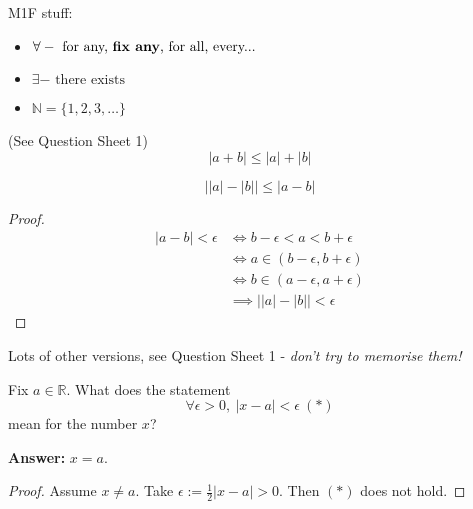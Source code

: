 

\pagebreak
\setcounter{section}{-1}

\setcounter{lecture}{0}

\setcounter{page}{4}


M1F stuff:

\begin{itemize}
\item $\forall - \text{ for any, \textbf{fix any}, for all, every...}$
\item $\exists - \text{ there exists}$
\item $\mathbb{N} = \{1,2,3,\dots\}$ 
\end{itemize}

\begin{theorem}
(See Question Sheet 1)
	\[|a+b| \leq |a| + |b|\]
\end{theorem}

\begin{corollary}
\[\left||a| - |b|\right|\leq |a-b|	\]
\end{corollary}
\begin{proof}
\[
\begin{aligned}
|a-b| < \epsilon &\iff b-\epsilon < a < b + \epsilon\\
&\iff a \in (b-\epsilon, b+\epsilon)\\
&\iff b \in (a-\epsilon, a+\epsilon)	\\
&\implies \left||a| - |b|\right|< \epsilon
\end{aligned} \] 
\end{proof}

Lots of other versions, see Question Sheet 1 - \emph{don't try to memorise them!}\\



\begin{clicker}
Fix $a \in \mathbb{R}$. What does the statement 
\[\forall \epsilon >0,~|x-a|<\epsilon ~(*)\]
mean for the number $x$? 

\textbf{Answer:} $x = a$. 
\begin{proof}
Assume $x \neq a$. Take $\epsilon := \frac{1}{2}|x-a| > 0$. Then $(*)$ does not hold.	
\end{proof}

\end{clicker}








